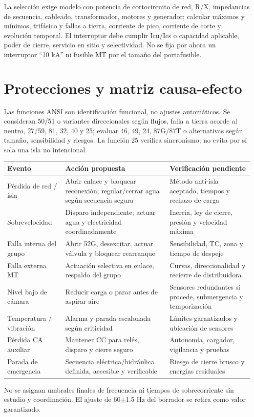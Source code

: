 La selección exige modelo con potencia de cortocircuito de red, R/X, impedancias de secuencia, cableado, transformador, motores y generador; calcular máximos y mínimos, trifásico y fallas a tierra, corriente de pico, corriente de corte y evolución temporal. El interruptor debe cumplir Icu/Ics o capacidad aplicable, poder de cierre, servicio en sitio y selectividad. No se fija por ahora un interruptor ``10 kA'' ni fusible MT por el tamaño del portafusible.

\section{Protecciones y matriz causa-efecto}
Las funciones ANSI son identificación funcional, no ajustes automáticos. Se consideran 50/51 o variantes direccionales según flujos, falla a tierra acorde al neutro, 27/59, 81, 32, 40 y 25; evaluar 46, 49, 24, 87G/87T o alternativas según tamaño, sensibilidad y riesgos. La función 25 verifica sincronismo; no evita por sí sola una isla no intencional.

\begin{longtable}{L{3.6cm}L{5.5cm}L{5.3cm}}
\toprule Evento & Acción propuesta & Verificación pendiente\\\midrule
Pérdida de red / isla & Abrir enlace y bloquear reconexión; regular/cerrar agua según secuencia segura & Método anti-isla aceptado, tiempos y rechazo de carga\\
Sobrevelocidad & Disparo independiente; actuar agua y electricidad coordinadamente & Inercia, ley de cierre, presión y velocidad máxima\\
Falla interna del grupo & Abrir 52G, desexcitar, actuar válvula y bloquear rearranque & Sensibilidad, TC, zona y tiempo de despeje\\
Falla externa MT & Actuación selectiva en enlace, respaldo del grupo & Curvas, direccionalidad y recierre de distribuidora\\
Nivel bajo de cámara & Reducir carga o parar antes de aspirar aire & Sensores redundantes si procede, submergencia y temporización\\
Temperatura / vibración & Alarma y parada escalonada según criticidad & Límites garantizados y ubicación de sensores\\
Pérdida CA auxiliar & Mantener CC para relés, disparo y cierre seguro & Autonomía, cargador, vigilancia y pruebas\\
Parada de emergencia & Secuencia eléctrica/hidráulica definida, accesible y verificable & Riesgo de cierre brusco y energías residuales\\
\bottomrule
\end{longtable}
No se asignan umbrales finales de frecuencia ni tiempos de sobrecorriente sin estudio y coordinación. El ajuste de 60$\pm$1.5 Hz del borrador se retira como valor garantizado.

